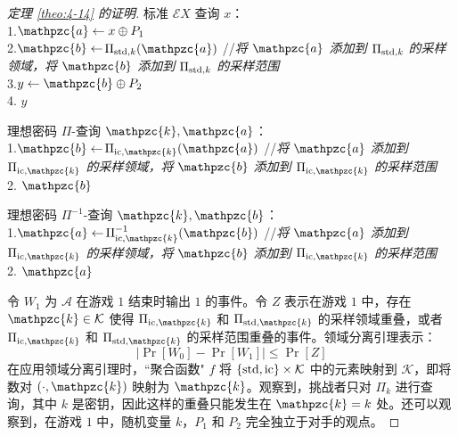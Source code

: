 \begin{proof}[定理 \ref{theo:4-14} 的证明]
\hspace*{5pt} 标准 $\mathcal{E}X$ 查询 $x$：\\
\hspace*{26pt} 1.\quad\;\;$\mathpzc{a}\leftarrow x\oplus P_1$\\
\hspace*{26pt} 2.\quad\;\;$\mathpzc{b}\leftarrow$\colorbox{gray!50}{$\Pi_{{\rm std},k}(\mathpzc{a})$}
\quad//\quad\emph{将 $\mathpzc{a}$ 添加到 $\Pi_{{\rm std},k}$ 的采样领域，将 $\mathpzc{b}$ 添加到 $\Pi_{{\rm std},k}$ 的采样范围}\\
\hspace*{26pt} 3.\quad\;\;$y\leftarrow\mathpzc{b}\oplus P_2$\\
\hspace*{26pt} 4.\quad\; $y$

\vspace{5pt}

\hspace*{5pt} 理想密码 $\Pi$-查询 $\mathpzc{k},\mathpzc{a}$：\\
\hspace*{26pt} 1.\quad\;\;$\mathpzc{b}\leftarrow$\colorbox{gray!50}{$\Pi_{{\rm ic},\mathpzc{k}}(\mathpzc{a})$}
\;\;\quad//\quad\emph{将 $\mathpzc{a}$ 添加到 $\Pi_{{\rm ic},\mathpzc{k}}$ 的采样领域，将 $\mathpzc{b}$ 添加到 $\Pi_{{\rm ic},\mathpzc{k}}$ 的采样范围}\\
\hspace*{26pt} 2.\quad\; $\mathpzc{b}$

\vspace{5pt}

\hspace*{5pt} 理想密码 $\Pi^{-1}$-查询 $\mathpzc{k},\mathpzc{b}$：\\
\hspace*{26pt} 1.\quad\;\;$\mathpzc{a}\leftarrow$\colorbox{gray!50}{$\Pi_{{\rm ic},\mathpzc{k}}^{-1}(\mathpzc{b})$}
\;\;\quad//\quad\emph{将 $\mathpzc{a}$ 添加到 $\Pi_{{\rm ic},\mathpzc{k}}$ 的采样领域，将 $\mathpzc{b}$ 添加到 $\Pi_{{\rm ic},\mathpzc{k}}$ 的采样范围}\\
\hspace*{26pt} 2.\quad\; $\mathpzc{a}$

\vspace{5pt}

令 $W_1$ 为 $\mathcal{A}$ 在游戏 $1$ 结束时输出 $1$ 的事件。令 $Z$ 表示在游戏 $1$ 中，存在 $\mathpzc{k}\in\mathcal{K}$ 使得 $\Pi_{{\rm ic},\mathpzc{k}}$ 和 $\Pi_{{\rm std},\mathpzc{k}}$ 的采样领域重叠，或者 $\Pi_{{\rm ic},\mathpzc{k}}$ 和 $\Pi_{{\rm std},\mathpzc{k}}$ 的采样范围重叠的事件。领域分离引理表示：
\begin{equation}\label{eq:4-41}
|\Pr[W_0]-\Pr[W_1]|\leq\Pr[Z]
\end{equation}
在应用领域分离引理时，``聚合函数" $f$ 将 $\{{\rm std},{\rm ic}\}\times\mathcal{K}$ 中的元素映射到 $\mathcal{K}$，即将数对 $(\cdot,\mathpzc{k})$ 映射为 $\mathpzc{k}$。观察到，挑战者只对 $\Pi_k$ 进行查询，其中 $k$ 是密钥，因此这样的重叠只能发生在 $\mathpzc{k}=k$ 处。还可以观察到，在游戏 $1$ 中，随机变量 $k$，$P_1$ 和 $P_2$ 完全独立于对手的观点。


\end{proof}
